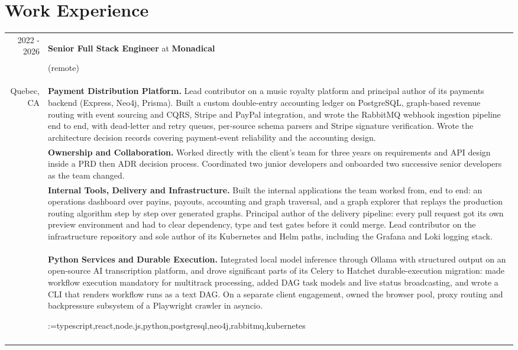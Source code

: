 \documentclass[letterpaper,10pt]{article}
\makeatletter
\newcommand{\sotag}[1]{\tikz[baseline]{\node[anchor=base, rounded corners=0.5ex, text height=1.5ex, text depth=.25ex, fill=tagbg, draw=tagbg, text=tagtxt] {#1};}}
\newcommand{\sotagrow}[1]{\par\vspace{4pt}\noindent\@for\sotagitem:=#1\do{\sotag{\sotagitem} }\\}
\newcommand{\job}[2]{\large\sffamily \textbf{#1} at \textbf{#2}\rule[-0.45em]{0pt}{1.45em}}
\newcommand{\sep}{\multicolumn{2}{c}{}\\}
\makeatother
\begin{document}
\section{Work Experience}
\begin{longtable}{r|p{}}

  \textsc{2022 - 2026} & \job{Senior Full Stack Engineer}{Monadical} (remote)\\
    {\small Quebec, CA} &\textbf{Payment Distribution Platform.} Lead contributor on a music royalty platform and principal author of its payments backend (Express, Neo4j, Prisma). Built a custom double-entry accounting ledger on PostgreSQL, graph-based revenue routing with event sourcing and CQRS, Stripe and PayPal integration, and wrote the RabbitMQ webhook ingestion pipeline end to end, with dead-letter and retry queues, per-source schema parsers and Stripe signature verification. Wrote the architecture decision records covering payment-event reliability and the accounting design.\\[0.4em]
    &\textbf{Ownership and Collaboration.} Worked directly with the client's team for three years on requirements and API design inside a PRD then ADR decision process. Coordinated two junior developers and onboarded two successive senior developers as the team changed.\\[0.4em]
    &\textbf{Internal Tools, Delivery and Infrastructure.} Built the internal applications the team worked from, end to end: an operations dashboard over payins, payouts, accounting and graph traversal, and a graph explorer that replays the production routing algorithm step by step over generated graphs. Principal author of the delivery pipeline: every pull request got its own preview environment and had to clear dependency, type and test gates before it could merge. Lead contributor on the infrastructure repository and sole author of its Kubernetes and Helm paths, including the Grafana and Loki logging stack.\\[0.4em]
    &\textbf{Python Services and Durable Execution.} Integrated local model inference through Ollama with structured output on an open-source AI transcription platform, and drove significant parts of its Celery to Hatchet durable-execution migration: made workflow execution mandatory for multitrack processing, added DAG task models and live status broadcasting, and wrote a CLI that renders workflow runs as a text DAG. On a separate client engagement, owned the browser pool, proxy routing and backpressure subsystem of a Playwright crawler in asyncio.
    \sotagrow{typescript,react,node.js,python,postgresql,neo4j,rabbitmq,kubernetes}\sep


\end{longtable}
\end{document}
